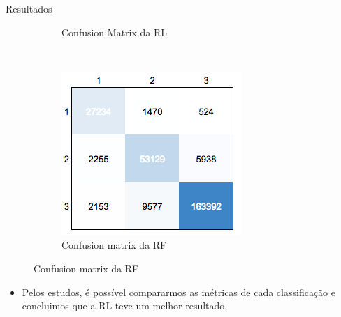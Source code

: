 \documentclass[final,hyperref={pdfpagelabels=false, brazil}]{beamer}
\let\olditem=\item%
\renewcommand{\item}{\olditem \justifying}%
\begin{document}
\begin{frame}[t]
\begin{columns}[t]
\begin{column}{.465\textwidth}
\begin{block}{Resultados}
\begin{itemize}
\begin{itemize}
\begin{figure}[t!]
\begin{subfigure}[t]{0.42\textwidth}
        \caption{Confusion Matrix da RL}
    \end{subfigure}%
    ~ 
    \begin{subfigure}[t]{0.43\textwidth}
        \centering
        \includegraphics[width=1\linewidth]{cm-tree.png}
        \caption{Confusion matrix da RF}
    \end{subfigure}


\end{figure}





\end{itemize}

\begin{itemize}
\item Pelos estudos, é possível compararmos as métricas de cada classificação e concluimos que a RL teve um melhor resultado.






\end{itemize}
\end{itemize}
\end{block}
\end{column}
\end{columns}
\end{frame}
\end{document}

